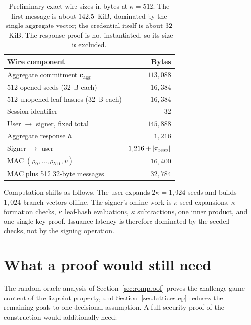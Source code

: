 \documentclass[11pt]{article}
\begin{document}
\begin{table}[htbp]
\centering
\begin{tabular}{lr}
\toprule
Wire component & Bytes \\
\midrule
Aggregate commitment $\mathbf c_{\mathrm{agg}}$ & $113{,}088$ \\
512 opened seeds (32~B each) & $16{,}384$ \\
512 unopened leaf hashes (32~B each) & $16{,}384$ \\
Session identifier & $32$ \\
\midrule
User $\rightarrow$ signer, fixed total & $145{,}888$ \\
Aggregate response $h$ & $1{,}216$ \\
Signer $\rightarrow$ user & $1{,}216+|\pi_{\rm resp}|$ \\
MAC $(\rho_0,\ldots,\rho_{511},v)$ & $16{,}400$ \\
MAC plus 512 32-byte messages & $32{,}784$ \\
\bottomrule
\end{tabular}
\caption{Preliminary exact wire sizes in bytes at $\kappa=512$.  The first
message is about $142.5$~KiB, dominated by the single aggregate vector; the
credential itself is about $32$~KiB.  The response proof is not instantiated,
so its size is excluded.}
\label{tab:wire}
\end{table}

Computation shifts as follows.  The user expands $2\kappa=1{,}024$ seeds and
builds $1{,}024$ branch vectors offline.  The signer's online work is
$\kappa$ seed expansions, $\kappa$ formation checks, $\kappa$ leaf-hash
evaluations, $\kappa$ subtractions,
one inner product, and one single-key proof.  Issuance latency is
therefore dominated by the seeded checks, not by the signing operation.

\section{What a proof would still need}
\label{sec:proofneeds}

The random-oracle analysis of Section~\ref{sec:romproof} proves the
challenge-game content of the fixpoint property, and
Section~\ref{sec:latticestep} reduces the remaining goals to one decisional
assumption.  A full security proof of the construction would additionally
need:
\end{document}
